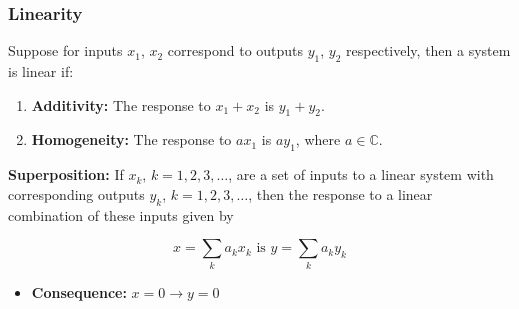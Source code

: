     \subsubsection{Linearity}
    \begin{definition}

        Suppose for inputs $x_1$, $x_2$ correspond to outputs $y_1$, $y_2$ respectively, then a system is linear if:
        \begin{enumerate}
            \item \textbf{Additivity:} The response to $x_1 + x_2$ is $y_1 + y_2$.
            \item \textbf{Homogeneity:} The response to $ax_1$ is $ay_1$, where $a \in \mathbb{C}$.
        \end{enumerate}
        \vspace{1em}

        \textbf{Superposition:}
        If $x_k$, $k = 1, 2, 3, \ldots$, are a set of inputs to a linear system with corresponding outputs $y_k$, $k = 1, 2, 3, \ldots$, then the response to a linear combination of these inputs given by

        \[
        x = \sum_k a_k x_k \text{ is } y = \sum_k a_k y_k 
        \]
        \begin{itemize}
            \item \textbf{Consequence:} $x = 0 \rightarrow y = 0$
        \end{itemize}
    \end{definition}